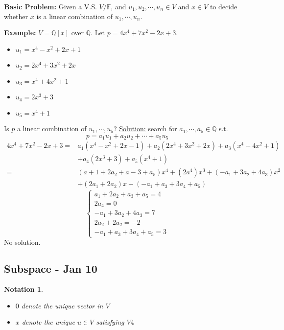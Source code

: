 \documentclass[12pt]{article}
\theoremstyle{plain}
\newtheorem{notation}{Notation}[subsection]
\begin{document}
	{\color{Brown}
	\textbf{Basic Problem: }
	Given a V.S. $V/\mathbb{F}$, and $u_1, u_2, \cdots,u_n \in V$ and $x\in V$
	to decide whether $x$ is a linear combination of $u_1,\cdots, u_n$.
	
	\textbf{Example: }
	$V = \mathbb{Q}[x]$ over $\mathbb{Q}$. Let $p = 4x^4 + 7x^2 -2x+3$. 
	\begin{itemize}
		\item $u_1 = x^4 - x^2 + 2x + 1$
		\item $u_2 = 2x^4 + 3x^2 + 2x$
		\item $u_3 = x^4 + 4x^2 + 1$
		\item $u_4 = 2x^3 + 3$
		\item $u_5 = x^4 + 1$
	\end{itemize}
	Is $p$ a linear combination of $u_1, \cdots, u_5$?
	\underline{Solution:} search for $a_1,\cdots,a_5 \in \mathbb{Q}$ s.t. 
	\[
		p = a_1 u_1+a_2u_2+\cdots+a_5u_5
	\]
	\begin{align*}
		4x^4+7x^2-2x+3 
		=& a_1(x^4-x^2+2x-1)+a_2(2x^4+3x^2+2x)+a_3(x^4+4x^2+1)\\
		 &+a_4(2x^3+3)+a_5(x^4+1)\\
		=& (a+1+2a_2+a-3+a_5)x^4+(2a^4)x^3+(-a_1+3a_2+4a_3)x^2\\
		 &+(2a_1+2a_2)x	+(-a_1+a_3+3a_4+a_5)
	\end{align*}
	\[
		\begin{cases}
			a_1+2a_2+a_3+a_5 = 4\\
			2a_4=0\\
			-a_1+3a_2+4a_3 = 7\\
			2a_2+2a_2=-2\\
			-a_1+a_3+3a_4+a_5=3
		\end{cases}
	\]
	No solution. 

	}




	\newpage
	\subsection{Subspace - Jan 10}
	\begin{notation}
		$ $
		\begin{itemize}
			\item 	$0$ denote the unique vector in $V$
			\item 	$x$ denote the unique $u\in V$ satisfying $V4$ \\
		\end{itemize}
	\end{notation}
\end{document}
